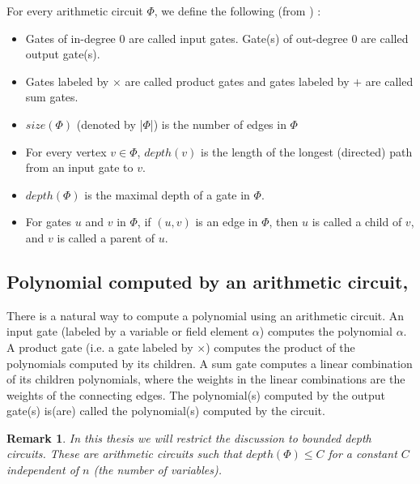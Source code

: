\documentclass[12pt]{caltech_thesis}
\theoremstyle{plain}
\newtheorem{remark}{Remark}
\theoremstyle{definition}
\begin{document}
For every arithmetic circuit $\Phi$, we define the following (from \cite{SY10}) :
\begin{itemize}
\renewcommand\labelitemi{--}

\item Gates of in-degree $0$ are called input gates. Gate(s) of out-degree $0$ are called output gate(s).
\item Gates labeled by $\times$ are called product gates and gates labeled by $+$ are called sum gates.
 \item $size(\Phi)$ (denoted by |$\Phi$|) is the number of edges in $\Phi$
 \item For every vertex $v\in \Phi$, $depth(v)$ is the length of the longest (directed) path from an input gate to $v$.
 \item $depth(\Phi)$ is the maximal depth of a gate in $\Phi$.
\item For gates $u$ and $v$ in $\Phi$, if $(u,v)$ is an edge in $\Phi$, then $u$ is called a child of $v$, and $v$ is called a parent of $u$.
 \end{itemize}

 
\subsection{Polynomial computed by an arithmetic circuit, \cite{SY10} }
There is a natural way to compute a polynomial using an arithmetic circuit. An input gate (labeled by a variable or field element $\alpha$)
computes the polynomial $\alpha$. A product gate (i.e. a gate labeled by $\times$) computes the product of the polynomials computed by its 
children. A sum gate computes a linear combination of its children polynomials, where the weights in the linear combinations are the weights
of the connecting edges. The polynomial(s) computed by the output gate(s) is(are) called the polynomial(s) computed by the circuit. 


\begin{remark}
 In this thesis we will restrict the discussion to bounded depth circuits. These are arithmetic circuits 
 such that $depth(\Phi)\leq C$ for a constant $C$ independent of $n$ (the number of variables). 
\end{remark}
\end{document}
